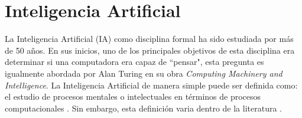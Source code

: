 


 

\section{Inteligencia Artificial}

La Inteligencia Artificial (IA) como disciplina formal  ha sido estudiada por más de 50 años. En sus inicios, uno de los principales objetivos de esta disciplina era determinar si una computadora era capaz de “pensar", esta pregunta es igualmente abordada por Alan Turing\cite{turing1950computing} en su obra \emph{Computing Machinery and Intelligence}. La Inteligencia Artificial de manera simple puede ser definida como: el estudio de procesos mentales o intelectuales en t\'{e}rminos de procesos computacionales \cite{aimodern}. Sin embargo, esta definici\'{o}n varia dentro de la literatura \cite{haugeland1985,bellman1978,winston1992learning}. 

